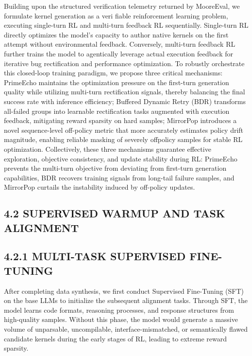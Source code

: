 \documentclass[
  10
]{article}
\begin{document}
Building upon the structured verification telemetry returned by
MooreEval, we formulate kernel generation as a veri fiable reinforcement
learning problem, executing single-turn RL and multi-turn feedback RL
sequentially. Single-turn RL directly optimizes the model's capacity to
author native kernels on the first attempt without environmental
feedback. Conversely, multi-turn feedback RL further trains the model to
agentically leverage actual execution feedback for iterative bug
rectification and performance optimization. To robustly orchestrate this
closed-loop training paradigm, we propose three critical mechanisms:
PrimeEcho maintains the optimization pressure on the first-turn
generation quality while utilizing multi-turn rectification signals,
thereby balancing the final success rate with inference efficiency;
Buffered Dynamic Retry (BDR) transforms all-failed groups into learnable
rectification tasks augmented with execution feedback, mitigating reward
sparsity on hard samples; MirrorPop introduces a novel sequence-level
off-policy metric that more accurately estimates policy drift magnitude,
enabling reliable masking of severely offpolicy samples for stable RL
optimization. Collectively, these three mechanisms guarantee effective
exploration, objective consistency, and update stability during RL:
PrimeEcho prevents the multi-turn objective from deviating from
first-turn generation capabilities, BDR recovers training signals from
long-tail failure samples, and MirrorPop curtails the instability
induced by off-policy updates.

\subsection{4.2 SUPERVISED WARMUP AND TASK
ALIGNMENT}\label{supervised-warmup-and-task-alignment}

\subsection{4.2.1 MULTI-TASK SUPERVISED
FINE-TUNING}\label{multi-task-supervised-fine-tuning}

After completing data synthesis, we first conduct Supervised Fine-Tuning
(SFT) on the base LLMs to initialize the subsequent alignment tasks.
Through SFT, the model learns code formats, reasoning processes, and
response structures from high-quality samples. Without this phase, the
model would generate a massive volume of unparsable, uncompilable,
interface-mismatched, or semantically flawed candidate kernels during
the early stages of RL, leading to extreme reward sparsity.
\end{document}

